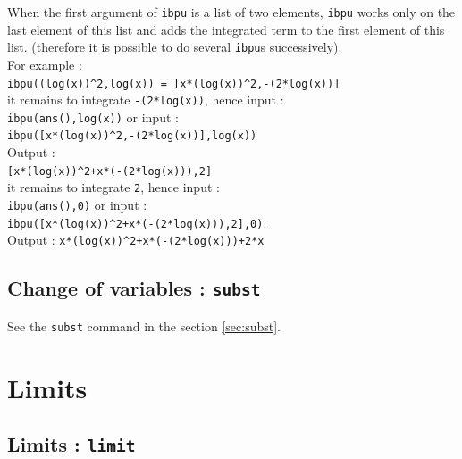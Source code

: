 \documentclass[a4paper,11pt]{book}
\begin{document}
When the first argument of {\tt ibpu} is a list of two elements, {\tt ibpu} 
works only on the last element of this list and adds the integrated term to
the first element of this list.  
(therefore it is possible to do several {\tt ibpu}s successively).\\
For example :\\
{\tt ibpu((log(x))\verb|^|2,log(x)) = [x*(log(x))\verb|^|2,-(2*log(x))]}\\ 
it remains to integrate {\tt -(2*log(x))}, hence input : \\
{\tt ibpu(ans(),log(x))}
 or input :\\
{\tt ibpu([x*(log(x))\verb|^|2,-(2*log(x))],log(x))}\\
Output :\\
{\tt [x*(log(x))\verb|^|2+x*(-(2*log(x))),2]}\\
it remains to integrate  {\tt 2}, hence input :\\
{\tt ibpu(ans(),0)} or input :\\
{\tt ibpu([x*(log(x))\verb|^|2+x*(-(2*log(x))),2],0)}.\\
Output :
{\tt x*(log(x))\verb|^|2+x*(-(2*log(x)))+2*x}

\subsection{Change of variables : {\tt subst}}
See the {\tt subst} command  in the section \ref{sec:subst}. 

\section{Limits}
\subsection{Limits : {\tt limit}}\label{sec:limit}
\end{document}
